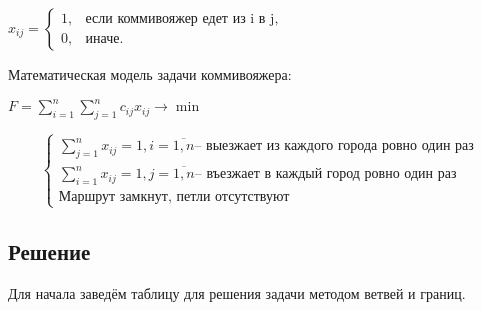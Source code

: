 $ x_{ij} = \begin{cases}
        1, & \text{если коммивояжер едет из i в j}, \\
        0, & \text{иначе}.
    \end{cases} $

Математическая модель задачи коммивояжера:

$ F = \sum\limits_{i=1}^{n} \sum\limits_{j=1}^{n} c_{ij} x_{ij} \to \min $

\[
    \begin{cases}
        \sum\limits_{j=1}^{n} x_{ij} = 1, i = \overline{1, n} \text{-- выезжает из каждого города ровно один раз} \\
        \sum\limits_{i=1}^{n} x_{ij} = 1, j = \overline{1, n} \text{-- въезжает в каждый город ровно один раз}    \\
        \text{Маршрут замкнут, петли отсутствуют}
    \end{cases}
\]

\subsection{Решение}\label{07-lab-solution}

Для начала заведём таблицу для решения задачи методом ветвей и границ.

